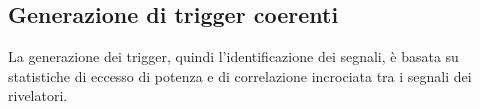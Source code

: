 \subsection{Generazione di trigger coerenti}
\label{section:coherent_trigger}

La generazione dei trigger, quindi l'identificazione dei segnali, è basata su statistiche di eccesso di potenza e di correlazione incrociata tra i segnali dei rivelatori. 

